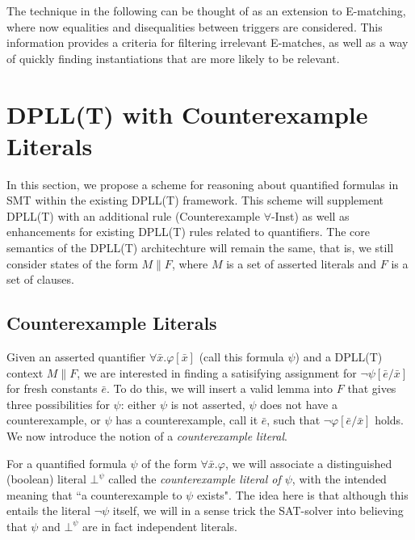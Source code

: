 \documentclass{llncs}
\begin{document}
The technique in the following can be thought of as an extension to E-matching, where now equalities and disequalities between triggers are considered.
This information provides a criteria for filtering irrelevant E-matches, as well as a way of quickly finding instantiations that are more likely to be relevant.

\section{DPLL(T) with Counterexample Literals}
\label{dpll-ce-lit}

In this section, we propose a scheme for reasoning about quantified formulas in SMT within the existing DPLL(T) framework.
This scheme will supplement DPLL(T) with an additional rule (Counterexample $\forall$-Inst) as well as enhancements for existing DPLL(T) rules related to quantifiers.
The core semantics of the DPLL(T) architechture will remain the same, that is, we still consider states of the form $M \parallel F$, where $M$ is a set of asserted literals and $F$ is a set of clauses.

\begin{comment}
Throughout the remainder of this document, we will assume that CNF-conversion has been applied to the body of all universally quantified formulas.
In other words, the only quantified formulas we consider are non-ground clauses of the form $\forall \bar{x}. ( l_1 \vee \ldots \vee l_n )[\bar{x}]$, where $l_1 \ldots l_n$ are theory literals.
\end{comment}

\subsection{Counterexample Literals}

Given an asserted quantifier $\forall \bar{x}. \varphi[\bar{x}]$ (call this formula $\psi$) and a DPLL(T) context $M \parallel F$, we are interested in finding a satisifying assignment for $ \neg \psi[\bar{e}/\bar{x}]$ for fresh constants $\bar{e}$.
To do this, we will insert a valid lemma into $F$ that gives three possibilities for $\psi$: either $\psi$ is not asserted, $\psi$ does not have a counterexample, or $\psi$ has a counterexample, call it $\bar{e}$, such that $\neg \varphi[\bar{e}/\bar{x}]$ holds.
We now introduce the notion of a \emph{counterexample literal}.

For a quantified formula $\psi$ of the form $\forall \bar{ x }. \varphi$, we will associate a distinguished (boolean) literal $\bot^\psi$ called the \emph{counterexample literal of $\psi$}, with the intended meaning that ``a counterexample to $\psi$ exists".
The idea here is that although this entails the literal $\neg \psi$ itself, we will in a sense trick the SAT-solver into believing that $\psi$ and $\bot^\psi$ are in fact independent literals.
\end{document}
